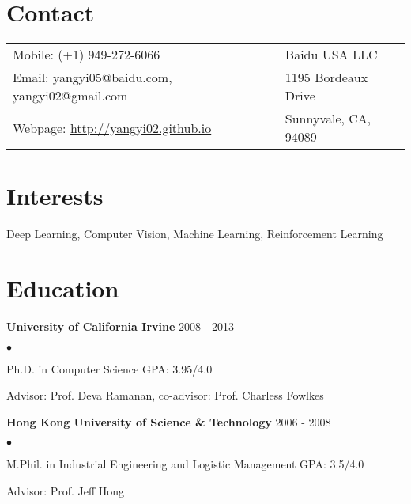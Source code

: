 \documentclass[margin]{res3}
\newenvironment{list2}{
  \begin{list}{$\bullet$}{%
      \setlength{\itemsep}{0.02in}
      \setlength{\parsep}{0in} \setlength{\parskip}{0in}
      \setlength{\topsep}{0in} \setlength{\partopsep}{0in}
      \setlength{\leftmargin}{0.2in}}}{\end{list}}
\begin{document}
\begin{resume}

\section{\sc Contact}
\begin{tabular}{@{}p{4.15in}p{2.15in}}
  Mobile: (+1) 949-272-6066 & Baidu USA LLC\\
  Email: yangyi05@baidu.com, yangyi02@gmail.com & 1195 Bordeaux Drive\\
  Webpage: \url{http://yangyi02.github.io} & Sunnyvale, CA, 94089\\
\end{tabular}


\section{\sc Interests}
Deep Learning, Computer Vision, Machine Learning, Reinforcement Learning


\section{\sc Education}
{\bf University of California Irvine} \hfill{2008 - 2013}
\begin{list2}
\item Ph.D. in Computer Science \hfill{GPA: 3.95/4.0}
\vspace{-2pt}
\item Advisor: Prof. Deva Ramanan, co-advisor: Prof. Charless Fowlkes 
\end{list2}
\vspace{-2pt}\vspace{-2pt}\vspace{-2pt}

{\bf Hong Kong University of Science \& Technology} \hfill {2006 - 2008}
\begin{list2}
\item M.Phil. in Industrial Engineering and Logistic Management \hfill {GPA: 3.5/4.0}
\vspace{-2pt}
\item Advisor: Prof. Jeff Hong 
\end{list2}
\vspace{-2pt}\vspace{-2pt}\vspace{-2pt}


\end{resume}
\end{document}
